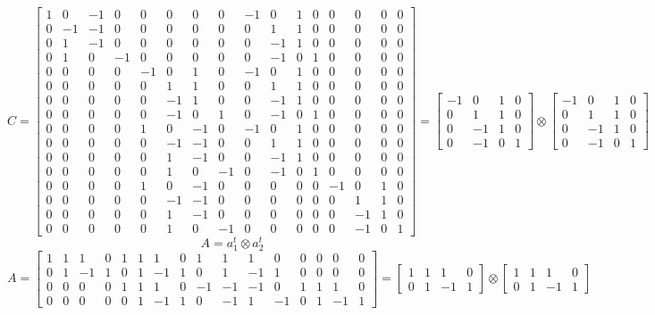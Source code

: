 \documentclass{article}%
\begin{document}
\[%
C = \left[\begin{array}{cccccccccccccccc}1 & 0 & -1 & 0 & 0 & 0 & 0 & 0 & -1 & 0 & 1 & 0 & 0 & 0 & 0 & 0\\0 & -1 & -1 & 0 & 0 & 0 & 0 & 0 & 0 & 1 & 1 & 0 & 0 & 0 & 0 & 0\\0 & 1 & -1 & 0 & 0 & 0 & 0 & 0 & 0 & -1 & 1 & 0 & 0 & 0 & 0 & 0\\0 & 1 & 0 & -1 & 0 & 0 & 0 & 0 & 0 & -1 & 0 & 1 & 0 & 0 & 0 & 0\\0 & 0 & 0 & 0 & -1 & 0 & 1 & 0 & -1 & 0 & 1 & 0 & 0 & 0 & 0 & 0\\0 & 0 & 0 & 0 & 0 & 1 & 1 & 0 & 0 & 1 & 1 & 0 & 0 & 0 & 0 & 0\\0 & 0 & 0 & 0 & 0 & -1 & 1 & 0 & 0 & -1 & 1 & 0 & 0 & 0 & 0 & 0\\0 & 0 & 0 & 0 & 0 & -1 & 0 & 1 & 0 & -1 & 0 & 1 & 0 & 0 & 0 & 0\\0 & 0 & 0 & 0 & 1 & 0 & -1 & 0 & -1 & 0 & 1 & 0 & 0 & 0 & 0 & 0\\0 & 0 & 0 & 0 & 0 & -1 & -1 & 0 & 0 & 1 & 1 & 0 & 0 & 0 & 0 & 0\\0 & 0 & 0 & 0 & 0 & 1 & -1 & 0 & 0 & -1 & 1 & 0 & 0 & 0 & 0 & 0\\0 & 0 & 0 & 0 & 0 & 1 & 0 & -1 & 0 & -1 & 0 & 1 & 0 & 0 & 0 & 0\\0 & 0 & 0 & 0 & 1 & 0 & -1 & 0 & 0 & 0 & 0 & 0 & -1 & 0 & 1 & 0\\0 & 0 & 0 & 0 & 0 & -1 & -1 & 0 & 0 & 0 & 0 & 0 & 0 & 1 & 1 & 0\\0 & 0 & 0 & 0 & 0 & 1 & -1 & 0 & 0 & 0 & 0 & 0 & 0 & -1 & 1 & 0\\0 & 0 & 0 & 0 & 0 & 1 & 0 & -1 & 0 & 0 & 0 & 0 & 0 & -1 & 0 & 1\end{array}\right] = \left[\begin{matrix}-1 & 0 & 1 & 0\\0 & 1 & 1 & 0\\0 & -1 & 1 & 0\\0 & -1 & 0 & 1\end{matrix}\right] \otimes \left[\begin{matrix}-1 & 0 & 1 & 0\\0 & 1 & 1 & 0\\0 & -1 & 1 & 0\\0 & -1 & 0 & 1\end{matrix}\right]%
\]%
\[%
A = a_1^t \otimes a_2^t%
\]%
\[%
A = \left[\begin{array}{cccccccccccccccc}1 & 1 & 1 & 0 & 1 & 1 & 1 & 0 & 1 & 1 & 1 & 0 & 0 & 0 & 0 & 0\\0 & 1 & -1 & 1 & 0 & 1 & -1 & 1 & 0 & 1 & -1 & 1 & 0 & 0 & 0 & 0\\0 & 0 & 0 & 0 & 1 & 1 & 1 & 0 & -1 & -1 & -1 & 0 & 1 & 1 & 1 & 0\\0 & 0 & 0 & 0 & 0 & 1 & -1 & 1 & 0 & -1 & 1 & -1 & 0 & 1 & -1 & 1\end{array}\right] = \left[\begin{matrix}1 & 1 & 1 & 0\\0 & 1 & -1 & 1\end{matrix}\right] \otimes \left[\begin{matrix}1 & 1 & 1 & 0\\0 & 1 & -1 & 1\end{matrix}\right]%
\]%
\end{document}
